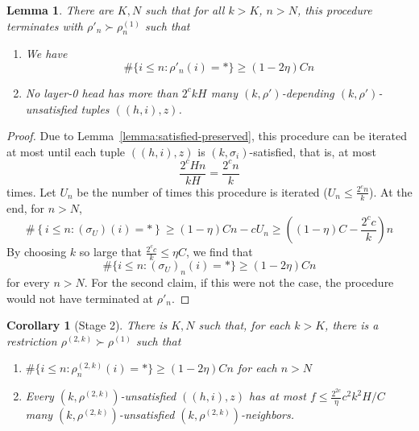 \documentclass[11pt,letterpaper]{article}
\newcounter{theorem}
\newtheorem{corollary}[theorem]{Corollary}
\newtheorem{lemma}[theorem]{Lemma}
\begin{document}
\begin{lemma}\label{lemma:termination}
There are $K, N$ such that for all $k > K$, $n > N$, this procedure terminates with $\rho'_n \succ \rho^{(1)}_n$ such that
\begin{enumerate}
    \item We have
\begin{equation}
    \# \{i \leq n: \rho'_n(i) = *\} \geq (1-2\eta) C n
\end{equation}
\item No layer-0 head has more than $2^c kH$ many $(k,\rho')$-depending $(k,\rho')$-unsatisfied tuples $((h,i),z)$.
\end{enumerate}
\end{lemma}

\begin{proof}
Due to Lemma~\ref{lemma:satisfied-preserved}, this procedure can be iterated at most until each tuple $((h,i),z)$ is $(k,\sigma_i)$-satisfied, that is, at most
\begin{equation}
\frac{2^c H n}{kH} = \frac{2^c n}{k}
\end{equation}
times.
Let $U_n$ be the number of times this procedure is iterated ($U_n \leq \frac{2^c n}{k}$).
At the end, for $n > N$,
\begin{equation}
\#\left\{i \leq n: (\sigma_U)(i) = *\right\} \geq (1-\eta) C n - cU_n \geq \left((1-\eta) C  - \frac{2^c c}{k}\right) n
\end{equation}
By choosing $k$ so large that $\frac{2^c c}{k} \leq \eta C$, we find that
\begin{equation}
    \# \{i \leq n: (\sigma_U)_n(i) = *\} \geq (1-2\eta) C n
\end{equation}
for every $n > N$.
For the second claim, if this were not the case, the procedure would not have terminated at $\rho'_n$.
\end{proof}

\begin{corollary}[Stage 2]\label{cor:stage-2}
There is $K, N$ such that, for each $k > K$, there is a restriction $\rho^{(2,k)} \succ \rho^{(1)}$ such that

\begin{enumerate}
\item $\# \{i \leq n: \rho^{(2,k)}_n(i) = *\} \geq (1-2\eta) C n$ for each $n > N$
\item Every $(k,\rho^{(2,k)})$-unsatisfied $((h,i),z)$ has at most $f \leq \frac{2^{2c}}{\eta}c^2k^2H/C$ many $(k,\rho^{(2,k)})$-unsatisfied $(k,\rho^{(2,k)})$-neighbors.
\end{enumerate}
\end{corollary}
\end{document}
